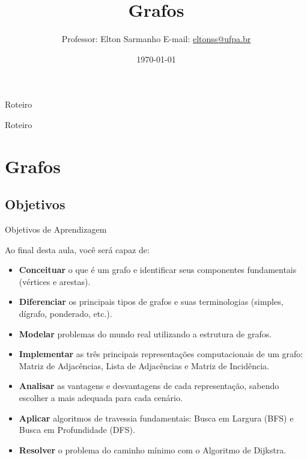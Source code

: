 \documentclass[xcolor=table]{beamer}
\title[Estrutura de Dados II]{Grafos}
\author[Elton Sarmanho]{
  Professor: Elton Sarmanho\inst{1}\newline
  E-mail: \href{mailto:eltonss@ufpa.br}{eltonss@ufpa.br}\newline
  \href{https://github.com/eltonsarmanho}{\faGithub}
  \href{https://www.linkedin.com/in/elton-sarmanho-836553185/}{\faLinkedin}\newline
  \ccbyncsa
}
\institute[UFPA]{\inst{1}Faculdade de Sistemas de Informação - UFPA/CUTINS}
\date{\today}
\begin{document}
\begin{frame}
  \titlepage
\end{frame}

\begin{frame}{Roteiro}
  \tableofcontents[sections={1-2}]
\end{frame}

\begin{frame}{Roteiro}
  \tableofcontents[sections={3-4}]
\end{frame}

\section{Grafos}

\subsection{Objetivos}
\begin{frame}{Objetivos de Aprendizagem}
  \begin{block}{Ao final desta aula, você será capaz de:}
    \footnotesize
    \begin{itemize}
      \item \textbf{Conceituar} o que é um grafo e identificar seus componentes fundamentais (vértices e arestas).
      \item \textbf{Diferenciar} os principais tipos de grafos e suas terminologias (simples, dígrafo, ponderado, etc.).
      \item \textbf{Modelar} problemas do mundo real utilizando a estrutura de grafos.
      \item \textbf{Implementar} as três principais representações computacionais de um grafo: Matriz de Adjacências, Lista de Adjacências e Matriz de Incidência.
      \item \textbf{Analisar} as vantagens e desvantagens de cada representação, sabendo escolher a mais adequada para cada cenário.
      \item \textbf{Aplicar} algoritmos de travessia fundamentais: Busca em Largura (BFS) e Busca em Profundidade (DFS).
      \item \textbf{Resolver} o problema do caminho mínimo com o Algoritmo de Dijkstra.
    \end{itemize}
  \end{block}
\end{frame}
\end{document}
